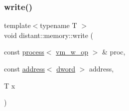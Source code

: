 \mbox{\label{namespacedistant_1_1memory_a4a6bb40c53cd73bc18f548238ba977b1}} 
\subsubsection{\texorpdfstring{write()}{write()}\hspace{0.1cm}{\footnotesize\ttfamily [2/2]}}
{\footnotesize\ttfamily template$<$typename T $>$ \\
void distant\+::memory\+::write (\begin{DoxyParamCaption}\item[{const \mbox{\hyperlink{classdistant_1_1kernel__objects_1_1process}{process}}$<$ \mbox{\hyperlink{namespacedistant_a6312277824ed2f04c414a61f24c135bb}{vm\+\_\+w\+\_\+op}} $>$ \&}]{proc,  }\item[{const \mbox{\hyperlink{classdistant_1_1memory_1_1address}{address}}$<$ \mbox{\hyperlink{namespacedistant_a9fa41a5a1a17dcbd24da1c1855c92489}{dword}} $>$}]{address,  }\item[{T}]{x }\end{DoxyParamCaption})}

